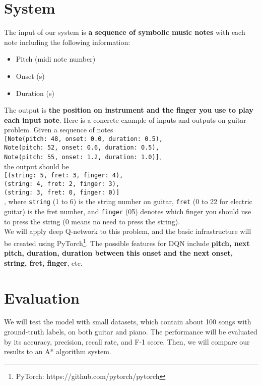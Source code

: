 \documentclass[12pt]{article}
\begin{document}
\section*{System}
The input of our system is \textbf{a sequence of symbolic music notes} with each note including the following information:
\begin{itemize}
	\itemsep -0.5em
    \item Pitch (midi note number)
    \item Onset (s)
    \item Duration (s)
\end{itemize}
The output is \textbf{the position on instrument and the finger you use to play each input note}. Here is a concrete example of inputs and outputs on guitar problem. Given a sequence of notes \\
\texttt{[Note(pitch: 48, onset: 0.0, duration: 0.5), \\Note(pitch: 52, onset: 0.6, duration: 0.5), \\Note(pitch: 55, onset: 1.2, duration: 1.0)]}, \\
the output should be \\ 
\texttt{[(string: 5, fret: 3, finger: 4), \\(string: 4, fret: 2, finger: 3), \\(string: 3, fret: 0, finger: 0)]} \\
, where \texttt{string} (1 to 6) is the string number on guitar, \texttt{fret} (0 to 22 for electric guitar) is the fret number, and \texttt{finger} (0\~5) denotes which finger you should use to press the string (0 means no need to press the string). \\


We will apply deep Q-network to this problem, and the basic infrastructure will be created using PyTorch\footnote{PyTorch: https://github.com/pytorch/pytorch}. The possible features for DQN include \textbf{pitch, next pitch, duration, duration between this onset and the next onset, string, fret, finger}, etc.

\section*{Evaluation}
We will test the model with small datasets, which contain about 100 songs with ground-truth labels, on both guitar and piano. The performance will be evaluated by its accuracy, precision, recall rate, and F-1 score. Then, we will compare our results to an A* algorithm system. 




\end{document}
